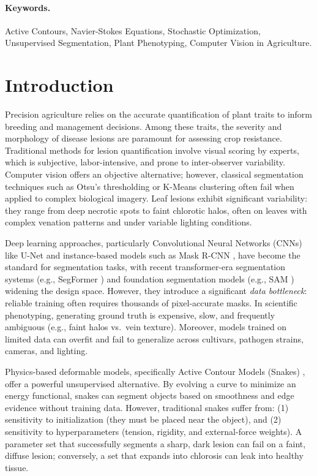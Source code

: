 \documentclass[11pt,a4paper]{article}
\begin{document}
\paragraph{Keywords.}
Active Contours, Navier-Stokes Equations, Stochastic Optimization, Unsupervised Segmentation, Plant Phenotyping, Computer Vision in Agriculture.

\section{Introduction}
Precision agriculture relies on the accurate quantification of plant traits to inform breeding and management decisions. Among these traits, the severity and morphology of disease lesions are paramount for assessing crop resistance. Traditional methods for lesion quantification involve visual scoring by experts, which is subjective, labor-intensive, and prone to inter-observer variability. Computer vision offers an objective alternative; however, classical segmentation techniques such as Otsu's thresholding or K-Means clustering often fail when applied to complex biological imagery. Leaf lesions exhibit significant variability: they range from deep necrotic spots to faint chlorotic halos, often on leaves with complex venation patterns and under variable lighting conditions.

Deep learning approaches, particularly Convolutional Neural Networks (CNNs) like U-Net \citep{ronneberger2015u} and instance-based models such as Mask R-CNN \citep{he2017mask}, have become the standard for segmentation tasks, with recent transformer-era segmentation systems (e.g., SegFormer \citep{xie2021segformer}) and foundation segmentation models (e.g., SAM \citep{kirillov2023segment}) widening the design space. However, they introduce a significant \emph{data bottleneck}: reliable training often requires thousands of pixel-accurate masks. In scientific phenotyping, generating ground truth is expensive, slow, and frequently ambiguous (e.g., faint halos vs.\ vein texture). Moreover, models trained on limited data can overfit and fail to generalize across cultivars, pathogen strains, cameras, and lighting.

Physics-based deformable models, specifically Active Contour Models (Snakes) \citep{kass1988snakes}, offer a powerful unsupervised alternative. By evolving a curve to minimize an energy functional, snakes can segment objects based on smoothness and edge evidence without training data. However, traditional snakes suffer from: (1) sensitivity to initialization (they must be placed near the object), and (2) sensitivity to hyperparameters (tension, rigidity, and external-force weights). A parameter set that successfully segments a sharp, dark lesion can fail on a faint, diffuse lesion; conversely, a set that expands into chlorosis can leak into healthy tissue.
\end{document}
